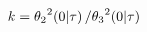 \[k={\mathop{\theta_{2}\/}\nolimits^{2}}\!\left(0\middle|\tau\right)/{\mathop{%
\theta_{3}\/}\nolimits^{2}}\!\left(0\middle|\tau\right)\]